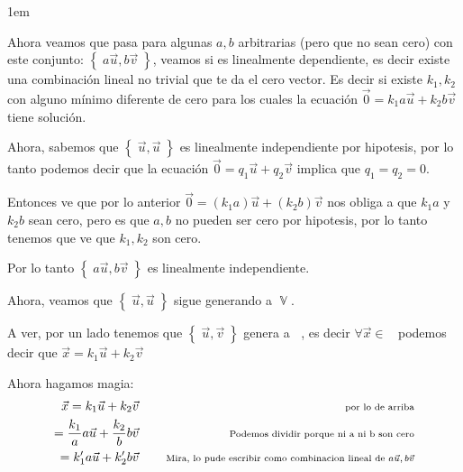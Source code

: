 \documentclass[12pt, fleqn]{report}                             %
\newenvironment{SmallIndentation}[1][0.75em]                    %
        {\begin{adjustwidth}{#1}{}\begin{footnotesize}}             %
        {\end{footnotesize}\end{adjustwidth}}                       %
\DeclareMathOperator \Space     {\quad}                         %
\newcommand \Remember[1]    {\Space\text{\scriptsize{#1}}}      %
\theoremstyle{break}                                            %
\DeclareMathOperator \GenericField {\mathbb{F}}                 %
\DeclareMathOperator \VectorSet    {\mathbb{V}}                 %
\DeclareMathOperator \VectorSpace  {\VectorSet_{\GenericField}} %
\newcommand{\Set}[1]            {\left\{ \; #1 \; \right\}}     %
\begin{document}
\begin{itemize}
\begin{SmallIndentation}[1em]
                            Ahora veamos que pasa para algunas $a, b$ arbitrarias (pero que no sean cero) con este conjunto: 
                            $\Set{a \vec u, b \vec v}$, veamos si es linealmente dependiente, es decir existe una combinación lineal
                            no trivial que te da el cero vector.
                            Es decir si existe $k_1, k_2$ con alguno mínimo diferente de cero para los cuales la ecuación 
                            $\vec 0 = k_1 a \vec u + k_2 b \vec v$  tiene solución.

                            Ahora, sabemos que $\Set{\vec u, \vec u}$ es linealmente independiente por hipotesis, por lo tanto
                            podemos decir que la ecuación $\vec 0 = q_1 \vec u + q_2 \vec v$ implica que $q_1 = q_2 = 0$.

                            Entonces ve que por lo anterior $\vec 0 = (k_1 a) \vec u + (k_2 b) \vec v$ nos obliga a que $k_1a$ y $k_2b$ 
                            sean cero, pero es que $a, b$ no pueden ser cero por hipotesis, por lo tanto tenemos que ve que $k_1, k_2$ son cero.

                            Por lo tanto $\Set{a \vec u, b \vec v}$ es linealmente independiente.

                            Ahora, veamos que $\Set{\vec u, \vec u}$ sigue generando a $\VectorSet$.

                            A ver, por un lado tenemos que $\Set{\vec u, \vec v}$ genera a $\VectorSpace$, es decir
                            $\forall \vec x \in \VectorSpace$ podemos decir que $\vec x = k_1 \vec u + k_2 \vec v$

                            Ahora hagamos magia:
                            \begin{align*}
                                \vec x  
                                    = k_1 \vec u + k_2 \vec v  
                                        &&\Remember{ por lo de arriba}                                                      \\
                                    = \frac{k_1}{a} a \vec u + \frac{k_2}{b} b\vec v
                                        &&\Remember{Podemos dividir porque ni a ni b son cero}                              \\
                                    = k_1' a \vec u + k_2' b\vec v
                                        &&\Remember{Mira, lo pude escribir como combinacion lineal de $a\vec u, b \vec v$}   
                            \end{align*}


\end{SmallIndentation}
\end{itemize}
\end{document}
